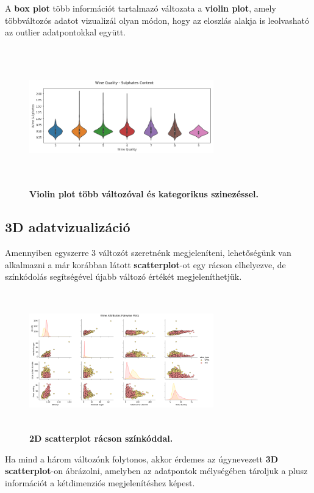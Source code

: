 \documentclass[12pt]{article}
\theoremstyle{plain}
\begin{document}
A \textbf{box plot} több információt tartalmazó változata a \textbf{violin plot}, amely többváltozós adatot vizualizál olyan módon, hogy az eloszlás alakja is leolvasható az outlier adatpontokkal együtt.

\begin{figure}[H]
    \centering
    \includegraphics[width=8cm, height=6cm]{media/violin.png}
    \caption{\textbf{Violin plot több változóval és kategorikus szinezéssel.}}
    \label{fig:GeneralDiagram}
 \end{figure}


\subsection{3D adatvizualizáció}
Amennyiben egyszerre 3 változót szeretnénk megjeleníteni, lehetőségünk van alkalmazni a már korábban látott \textbf{scatterplot}-ot egy rácson elhelyezve, de színkódolás segítségével újabb változó értékét megjeleníthetjük.

\begin{figure}[H]
    \centering
    \includegraphics[width=8cm, height=6cm]{media/3dscatter.png}
    \caption{\textbf{2D scatterplot rácson színkóddal.}}
    \label{fig:GeneralDiagram}
 \end{figure}
 
 Ha mind a három változónk folytonos, akkor érdemes az úgynevezett \textbf{3D scatterplot}-on ábrázolni, amelyben az adatpontok mélységében tároljuk a plusz információt a kétdimenziós megjelenítéshez képest.
 
\end{document}
